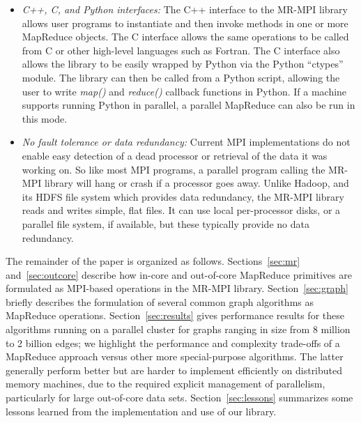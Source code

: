 \begin{itemize}
\item {\it C++, C, and Python interfaces:} The C++ interface to the
MR-MPI library allows user programs to instantiate and then invoke
methods in one or more MapReduce objects.  The C interface allows the
same operations to be called from C or other high-level languages such
as Fortran.  The C interface also allows the library to be easily
wrapped by Python via the Python ``ctypes'' module.  The library can
then be called from a Python script, allowing the user to write {\it
map()} and {\it reduce()} callback functions in Python.  If a machine
supports running Python in parallel, a parallel MapReduce can also be
run in this mode.

\item {\it No fault tolerance or data redundancy:} Current MPI
implementations do not enable easy detection of a dead processor or
retrieval of the data it was working on.  So like most MPI programs, a
parallel program calling the MR-MPI library will hang or crash if a
processor goes away.  Unlike Hadoop, and its HDFS file system which
provides data redundancy, the MR-MPI library reads and writes simple,
flat files.  It can use local per-processor disks, or a parallel file
system, if available, but these typically provide no data redundancy.

\end{itemize}

The remainder of the paper is organized as follows.
Sections~\ref{sec:mr} and~\ref{sec:outcore} describe how in-core and
out-of-core MapReduce primitives are formulated as MPI-based
operations in the MR-MPI library.  Section~\ref{sec:graph} briefly
describes the formulation of several common graph algorithms as
MapReduce operations.  Section~\ref{sec:results} gives performance
results for these algorithms running on a parallel cluster for graphs
ranging in size from 8 million to 2 billion edges; we highlight the
performance and complexity trade-offs of a MapReduce approach versus
other more special-purpose algorithms.  The latter generally perform
better but are harder to implement efficiently on distributed memory
machines, due to the required explicit management of parallelism,
particularly for large out-of-core data sets.
Section~\ref{sec:lessons} summarizes some lessons learned from the
implementation and use of our library.
